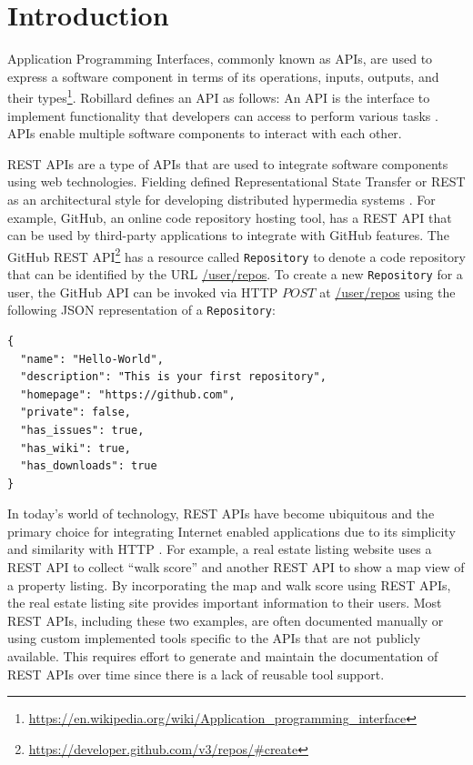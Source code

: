 \chapter{Introduction}
Application Programming Interfaces, commonly known as APIs, are used to express a software component in terms of its operations, inputs, outputs, and their types\footnote{\url{https://en.wikipedia.org/wiki/Application_programming_interface}}. Robillard defines an API as follows: An API is the interface to implement functionality that developers can access to perform various tasks \cite{Robillard_a_field_study, Robillard_what_makes}. APIs enable multiple software components to interact with each other.

REST APIs are a type of APIs that are used to integrate software components using web technologies. Fielding defined Representational State Transfer or REST as an architectural style for developing distributed hypermedia systems \cite{Fielding_rest}. For example, GitHub, an online code repository hosting tool, has a REST API that can be used by third-party applications to integrate with GitHub features. The GitHub REST API\footnote{\url{https://developer.github.com/v3/repos/\#create}} has a resource called \texttt{Repository} to denote a code repository that can be identified by the URL \url{/user/repos}. To create a new \texttt{Repository} for a user, the GitHub API can be invoked via HTTP $POST$ at \url{/user/repos} using the following JSON representation of a \texttt{Repository}:

\begin{verbatim}
{
  "name": "Hello-World",
  "description": "This is your first repository",
  "homepage": "https://github.com",
  "private": false,
  "has_issues": true,
  "has_wiki": true,
  "has_downloads": true
}
\end{verbatim}

In today's world of technology, REST APIs have become ubiquitous and the primary choice for integrating Internet enabled applications due to its simplicity and similarity with HTTP \cite{mangler2010origin}. For example, a real estate listing website uses a REST API to collect ``walk score'' and another REST API to show a map view of a property listing. By incorporating the map and walk score using REST APIs, the real estate listing site provides important information to their users. Most REST APIs, including these two examples, are often documented manually or using custom implemented tools specific to the APIs that are not publicly available. This requires effort to generate and maintain the documentation of REST APIs over time since there is a lack of reusable tool support.

